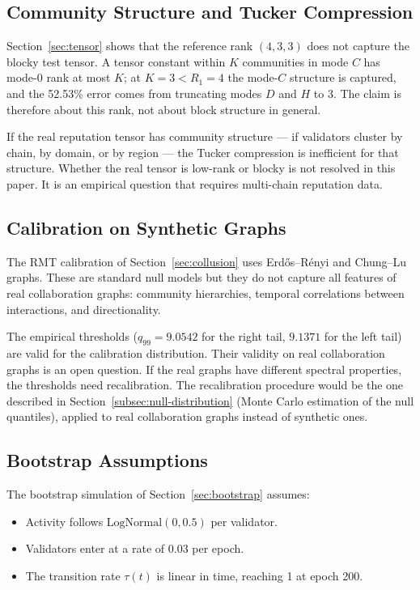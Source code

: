 \documentclass[11pt,a4paper]{article}
\numberwithin{equation}{section}
\numberwithin{table}{section}
\begin{document}
\subsection{Community Structure and Tucker Compression}
Section~\ref{sec:tensor} shows that the reference rank $(4,3,3)$ does not capture the blocky test tensor. A tensor constant within $K$ communities in mode $C$ has mode-0 rank at most $K$; at $K=3<R_1=4$ the mode-$C$ structure is captured, and the 52.53\% error comes from truncating modes $D$ and $H$ to 3. The claim is therefore about this rank, not about block structure in general.

If the real reputation tensor has community structure --- if validators cluster by chain, by domain, or by region --- the Tucker compression is inefficient for that structure. Whether the real tensor is low-rank or blocky is not resolved in this paper. It is an empirical question that requires multi-chain reputation data.

\subsection{Calibration on Synthetic Graphs}
The RMT calibration of Section~\ref{sec:collusion} uses Erd\H{o}s--R\'enyi and Chung--Lu graphs. These are standard null models but they do not capture all features of real collaboration graphs: community hierarchies, temporal correlations between interactions, and directionality.

The empirical thresholds ($q_{99} = 9.0542$ for the right tail, $9.1371$ for the left tail) are valid for the calibration distribution. Their validity on real collaboration graphs is an open question. If the real graphs have different spectral properties, the thresholds need recalibration. The recalibration procedure would be the one described in Section~\ref{subsec:null-distribution} (Monte Carlo estimation of the null quantiles), applied to real collaboration graphs instead of synthetic ones.

\subsection{Bootstrap Assumptions}
The bootstrap simulation of Section~\ref{sec:bootstrap} assumes:

\begin{itemize}[leftmargin=*]
\item Activity follows $\mathrm{LogNormal}(0, 0.5)$ per validator.
\item Validators enter at a rate of 0.03 per epoch.
\item The transition rate $\tau(t)$ is linear in time, reaching 1 at epoch 200.
\end{itemize}
\end{document}
